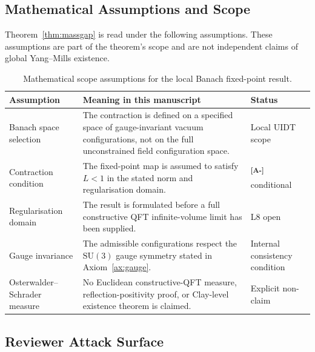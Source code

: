 \documentclass[12pt,a4paper,twoside]{article}
\theoremstyle{plain}
\theoremstyle{definition}
\theoremstyle{remark}
\newcommand{\catmark}[1]{\textsuperscript{\textsf{\textbf{[#1]}}}}
\begin{document}
\subsection*{Mathematical Assumptions and Scope}
\label{app:math-assumptions}

Theorem~\ref{thm:massgap} is read under the following assumptions. These
assumptions are part of the theorem's scope and are not independent claims of
global Yang--Mills existence.

\begin{table}[H]
\centering
\caption{Mathematical scope assumptions for the local Banach fixed-point result.}
\label{tab:math_scope}
{\setlength{\tabcolsep}{5pt}%
\renewcommand{\arraystretch}{1.28}%
\begin{tabular}{@{}>{\raggedright\arraybackslash}p{3.5cm}
                >{\raggedright\arraybackslash}p{7.3cm}
                >{\raggedright\arraybackslash}p{3.1cm}@{}}
\toprule
\textbf{Assumption} & \textbf{Meaning in this manuscript} & \textbf{Status} \\
\midrule
Banach space selection & The contraction is defined on a specified space of
 gauge-invariant vacuum configurations, not on the full unconstrained field
 configuration space. & Local UIDT scope \\
\midrule
Contraction condition & The fixed-point map is assumed to satisfy $L<1$ in
 the stated norm and regularisation domain. & \catmark{A-} conditional \\
\midrule
Regularisation domain & The result is formulated before a full constructive
 QFT infinite-volume limit has been supplied. & L8 open \\
\midrule
Gauge invariance & The admissible configurations respect the
 $\mathrm{SU}(3)$ gauge symmetry stated in Axiom~\ref{ax:gauge}. & Internal
 consistency condition \\
\midrule
Osterwalder--Schrader measure & No Euclidean constructive-QFT measure,
 reflection-positivity proof, or Clay-level existence theorem is claimed. &
 Explicit non-claim \\
\bottomrule
\end{tabular}
}
\end{table}

\subsection*{Reviewer Attack Surface}
\label{app:reviewer-attack-surface}
\end{document}
